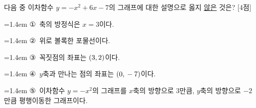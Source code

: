 다음 중 이차함수 $y=-x^2+6x-7$의 그래프에 대한 설명으로 옳지 \underline{않은} 것은? \mbox{[4점]}
\par\medskip\par\noindent\hangindent=1.4em {\small ①}\ 축의 방정식은 $x=3$이다.\par\noindent\hangindent=1.4em {\small ②}\ 위로 볼록한 포물선이다.\par\noindent\hangindent=1.4em {\small ③}\ 꼭짓점의 좌표는 $(3{,}\mkern3mu 2)$이다.\par\noindent\hangindent=1.4em {\small ④}\ $y$축과 만나는 점의 좌표는 $(0{,}\mkern3mu -7)$이다.\par\noindent\hangindent=1.4em {\small ⑤}\ 이차함수 $y=-x^2$의 그래프를 $x$축의 방향으로 $3$만큼, $y$축의 방향으로 $-2$만큼 평행이동한 그래프이다.\par\medskip

